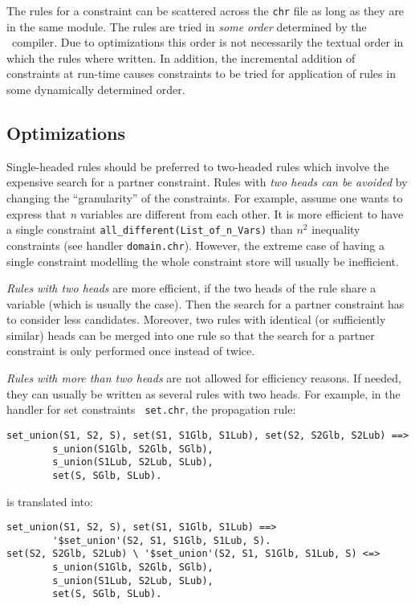 The rules for a constraint can be scattered across the {\tt chr} file
as long as they are in the same module.
The rules are tried in {\em some order} determined by
the \chr\ compiler. Due to optimizations this order is not necessarily
the textual order in which the rules where written.  In addition, the
incremental addition of constraints at run-time causes constraints to
be tried for application of rules in some dynamically determined
order.

\subsection{Optimizations}

Single-headed rules should be preferred to two-headed rules which
involve the expensive search for a partner constraint.
Rules with {\em two heads can be avoided} by changing the ``granularity'' of
the constraints. For example, assume one wants to express that {\em n}
variables are different from each other.  It is more efficient to have
a single constraint {\tt all\_different(List\_of\_n\_Vars)} than
$n^2$
inequality constraints (see handler {\tt domain.chr}).  However, the
extreme case of having a single constraint modelling the whole
constraint store will usually be inefficient.

{\em Rules with two heads} are more efficient, if the two heads of the
rule share a variable (which is usually the case). Then the search for
a partner constraint has to consider less candidates.  Moreover, two
rules with identical (or sufficiently similar) heads can be merged
into one rule so that the search for a partner constraint is only
performed once instead of twice.

{\em Rules with more than two heads} are not allowed for efficiency
reasons.  If needed, they can usually be written as several rules with
two heads.  For example, in the handler for set constraints {\tt
set.chr}, the propagation rule:
\begin{verbatim}
set_union(S1, S2, S), set(S1, S1Glb, S1Lub), set(S2, S2Glb, S2Lub) ==>
        s_union(S1Glb, S2Glb, SGlb),
        s_union(S1Lub, S2Lub, SLub),
        set(S, SGlb, SLub).
\end{verbatim}
is translated into:
\begin{verbatim}
set_union(S1, S2, S), set(S1, S1Glb, S1Lub) ==>
        '$set_union'(S2, S1, S1Glb, S1Lub, S).
set(S2, S2Glb, S2Lub) \ '$set_union'(S2, S1, S1Glb, S1Lub, S) <=>
        s_union(S1Glb, S2Glb, SGlb),
        s_union(S1Lub, S2Lub, SLub),
        set(S, SGlb, SLub).
\end{verbatim}

